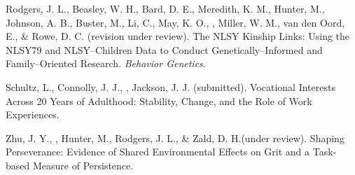 \begin{etaremune}
\item Rodgers, J. L., Beasley, W. H., Bard, D. E., Meredith, K. M., Hunter, M., Johnson, A. B., Buster, M., Li, C., May, K. O., \meb, Miller, W. M., van den Oord, E., \& Rowe, D. C. (revision under review). The NLSY Kinship Links: Using the NLSY79 and NLSY--Children Data to Conduct Genetically--Informed and Family--Oriented Research. \textit{Behavior Genetics}.
\item Schultz, L., Connolly, J. J., \meb, Jackson, J. J. (submitted). Vocational Interests Across 20 Years of Adulthood: Stability, Change, and the Role of Work Experiences. %
\item Zhu, J. Y., \meb, Hunter, M., Rodgers, J. L., \& Zald, D. H.(under review). Shaping Perseverance: Evidence of Shared Environmental Effects on Grit and a Task-based Measure of Persistence.%
\end{etaremune}